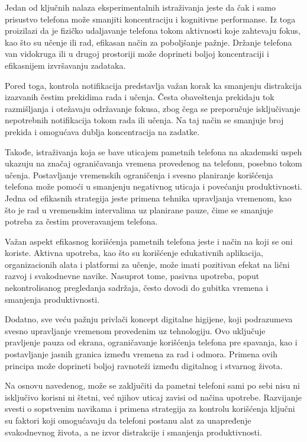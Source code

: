 \documentclass{article}
\begin{document}
Jedan od ključnih nalaza eksperimentalnih istraživanja jeste da čak i samo prisustvo telefona može smanjiti koncentraciju i kognitivne performanse. Iz toga proizilazi da je fizičko udaljavanje telefona tokom aktivnosti koje zahtevaju fokus, kao što su učenje ili rad, efikasan način za poboljšanje pažnje. Držanje telefona van vidokruga ili u drugoj prostoriji može doprineti boljoj koncentraciji i efikasnijem izvršavanju zadataka.

Pored toga, kontrola notifikacija predstavlja važan korak ka smanjenju distrakcija izazvanih čestim prekidima rada i učenja. Česta obaveštenja prekidaju tok razmišljanja i otežavaju održavanje fokusa, zbog čega se preporučuje isključivanje nepotrebnih notifikacija tokom rada ili učenja. Na taj način se smanjuje broj prekida i omogućava dublja koncentracija na zadatke.

Takođe, istraživanja koja se bave uticajem pametnih telefona na akademski uspeh ukazuju na značaj ograničavanja vremena provedenog na telefonu, posebno tokom učenja. Postavljanje vremenskih ograničenja i svesno planiranje korišćenja telefona može pomoći u smanjenju negativnog uticaja i povećanju produktivnosti. Jedna od efikasnih strategija jeste primena tehnika upravljanja vremenom, kao što je rad u vremenskim intervalima uz planirane pauze, čime se smanjuje potreba za čestim proveravanjem telefona.

Važan aspekt efikasnog korišćenja pametnih telefona jeste i način na koji se oni koriste. Aktivna upotreba, kao što su korišćenje edukativnih aplikacija, organizacionih alata i platformi za učenje, može imati pozitivan efekat na lični razvoj i svakodnevne navike. Nasuprot tome, pasivna upotreba, poput nekontrolisanog pregledanja sadržaja, često dovodi do gubitka vremena i smanjenja produktivnosti.

Dodatno, sve veću pažnju privlači koncept digitalne higijene, koji podrazumeva svesno upravljanje vremenom provedenim uz tehnologiju. Ovo uključuje pravljenje pauza od ekrana, ograničavanje korišćenja telefona pre spavanja, kao i postavljanje jasnih granica između vremena za rad i odmora. Primena ovih principa može doprineti boljoj ravnoteži između digitalnog i stvarnog života.

Na osnovu navedenog, može se zaključiti da pametni telefoni sami po sebi nisu ni isključivo korisni ni štetni, već njihov uticaj zavisi od načina upotrebe. Razvijanje svesti o sopstvenim navikama i primena strategija za kontrolu korišćenja ključni su faktori koji omogućavaju da telefoni postanu alat za unapređenje svakodnevnog života, a ne izvor distrakcije i smanjenja produktivnosti.
\end{document}
